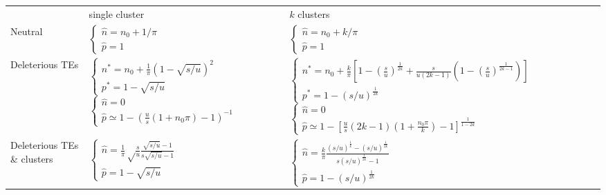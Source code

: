 \documentclass[10pt,a4paper]{article}
\begin{document}
\begin{table}
\renewcommand{\arraystretch}{3}
\begin{adjustwidth}{-2in}{0in}
\begin{flushright}
\begin{tabular}{p{3cm}p{6cm}p{7cm}}
 & single cluster & $k$ clusters \\
Neutral						& $\begin{cases} 
								\hat n = n_0 + 1/\pi \\ 
								\hat p = 1 
							\end{cases}$
							& $\begin{cases} 
								\hat n = n_0 + k/\pi \\ 
								\hat p = 1 
							\end{cases}$  \\
Deleterious TEs 			& $\begin{cases} 
								n^\ast = n_0 + \frac{1}{\pi}(1-\sqrt{s/u})^2 \\
								p^\ast = 1 - \sqrt{s/u} 
							\end{cases}$ 
							$\begin{cases}
								\hat n = 0 \\ 
								\hat p \simeq 1-(\frac{u}{s}(1+n_0\pi)-1)^{-1} 
							\end{cases}$
							& $\begin{cases} 
								n^\ast = n_0 + \frac{k}{\pi}[1 - (\frac{s}{u})^\frac{1}{2k} + \frac{s}{u(2k-1)} (1 - (\frac{s}{u})^\frac{1}{2k-1})] \\ 
								p^\ast = 1 - (s/u)^\frac{1}{2k}
							\end{cases}$ 
							$\begin{cases} 
								\hat n = 0 \\ 
								\hat p \simeq 1-[\frac{u}{s}(2k-1)(1+\frac{n_0 \pi}{k})-1]^\frac{1}{1-2k}
							\end{cases}$\\
Deleterious TEs \& clusters	& $ \begin{cases} 
								\hat n = \frac{1}{\pi} \sqrt\frac{s}{u} \frac{\sqrt{s/u}-1}{s\sqrt{s/u}-1} \\
								\hat p = 1 - \sqrt{s/u}
							\end{cases}$ &
							$\begin{cases}
								\hat n = \frac{k}{\pi} \frac{(s/u)^\frac{1}{k} - (s/u)^\frac{1}{2k}}{s (s/u)^\frac{1}{2k}-1} \\
								\hat p = 1-(s/u)^\frac{1}{2k}
							\end{cases}$

\end{tabular}
\end{flushright}
\end{adjustwidth}
\end{table}
\end{document}
